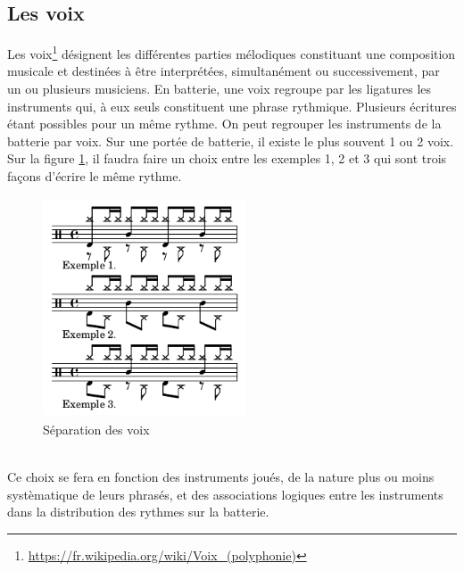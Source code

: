 \subsection*{Les voix}
Les voix\footnote{\url{https://fr.wikipedia.org/wiki/Voix_(polyphonie)}} désignent les différentes parties mélodiques constituant une composition musicale et destinées à être interprétées, simultanément ou successivement, par un ou plusieurs musiciens. En batterie, une voix regroupe par les ligatures les instruments qui, à eux seuls constituent une phrase rythmique. Plusieurs écritures étant possibles pour un même rythme. On peut regrouper les instruments de la batterie par voix. Sur une portée de batterie, il existe le plus souvent 1 ou 2 voix. Sur la figure \ref{sep_voix}, il faudra faire un choix entre les exemples 1, 2 et 3 qui sont trois façons d’écrire le même rythme.
\begin{figure}[h]
	\centering
	\includegraphics[height=65mm, width=60mm]{z_images/3_methodes/0_notation_de_la_batterie/7_voix.png}
	\caption{Séparation des voix}
	\label{sep_voix}
\end{figure}\\
Ce choix se fera en fonction des instruments joués, de la nature plus ou moins systèmatique de leurs phrasés, et des associations logiques entre les instruments dans la distribution des rythmes sur la batterie.\\
